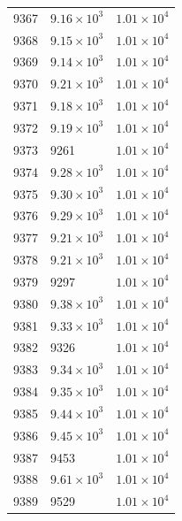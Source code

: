 \begin{table}[H]
\begin{tabular}{lll}
9367 & $\displaystyle 9.16 \times 10^{3}$ & $\displaystyle 1.01 \times 10^{4}$ \\
9368 & $\displaystyle 9.15 \times 10^{3}$ & $\displaystyle 1.01 \times 10^{4}$ \\
9369 & $\displaystyle 9.14 \times 10^{3}$ & $\displaystyle 1.01 \times 10^{4}$ \\
9370 & $\displaystyle 9.21 \times 10^{3}$ & $\displaystyle 1.01 \times 10^{4}$ \\
9371 & $\displaystyle 9.18 \times 10^{3}$ & $\displaystyle 1.01 \times 10^{4}$ \\
9372 & $\displaystyle 9.19 \times 10^{3}$ & $\displaystyle 1.01 \times 10^{4}$ \\
9373 & 9261 & $\displaystyle 1.01 \times 10^{4}$ \\
9374 & $\displaystyle 9.28 \times 10^{3}$ & $\displaystyle 1.01 \times 10^{4}$ \\
9375 & $\displaystyle 9.30 \times 10^{3}$ & $\displaystyle 1.01 \times 10^{4}$ \\
9376 & $\displaystyle 9.29 \times 10^{3}$ & $\displaystyle 1.01 \times 10^{4}$ \\
9377 & $\displaystyle 9.21 \times 10^{3}$ & $\displaystyle 1.01 \times 10^{4}$ \\
9378 & $\displaystyle 9.21 \times 10^{3}$ & $\displaystyle 1.01 \times 10^{4}$ \\
9379 & 9297 & $\displaystyle 1.01 \times 10^{4}$ \\
9380 & $\displaystyle 9.38 \times 10^{3}$ & $\displaystyle 1.01 \times 10^{4}$ \\
9381 & $\displaystyle 9.33 \times 10^{3}$ & $\displaystyle 1.01 \times 10^{4}$ \\
9382 & 9326 & $\displaystyle 1.01 \times 10^{4}$ \\
9383 & $\displaystyle 9.34 \times 10^{3}$ & $\displaystyle 1.01 \times 10^{4}$ \\
9384 & $\displaystyle 9.35 \times 10^{3}$ & $\displaystyle 1.01 \times 10^{4}$ \\
9385 & $\displaystyle 9.44 \times 10^{3}$ & $\displaystyle 1.01 \times 10^{4}$ \\
9386 & $\displaystyle 9.45 \times 10^{3}$ & $\displaystyle 1.01 \times 10^{4}$ \\
9387 & 9453 & $\displaystyle 1.01 \times 10^{4}$ \\
9388 & $\displaystyle 9.61 \times 10^{3}$ & $\displaystyle 1.01 \times 10^{4}$ \\
9389 & 9529 & $\displaystyle 1.01 \times 10^{4}$ \\

\end{tabular}
\end{table}
